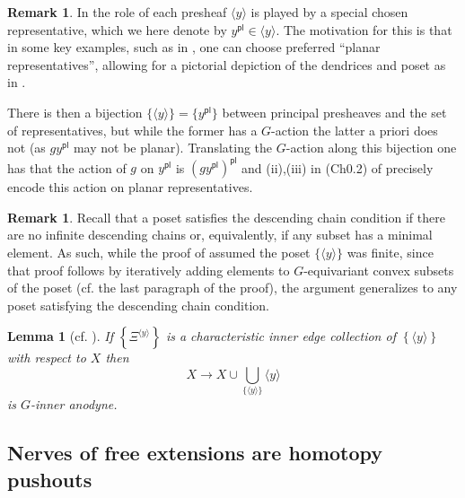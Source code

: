 \documentclass[a4paper,10pt
,draft
]{article}%
\numberwithin{equation}{section}
\numberwithin{figure}{section}
\newtheorem{lemma}[equation]{Lemma}%
\theoremstyle{definition} %
\newtheorem{remark}[equation]{Remark}%
\newcommand{\1}{\ensuremath{\mathbbm 1}}%
\begin{document}
\begin{remark}\label{CH02 REM}
	In \cite[Rem. 3.7]{BP_edss} the role of each presheaf 
	$\langle y \rangle$ is played by a special chosen representative,
	which we here denote by
	$y^{\mathsf{pl}} \in \langle y \rangle$. 
	The motivation for this is that in some key examples, such as in \cite[Ex. 3.9]{BP_edss}, one can choose preferred ``planar representatives'',
	allowing for a pictorial depiction of the dendrices and poset as in
	\cite[Fig. 3.1]{BP_edss}. 
	
	There is then a bijection $\{\langle y \rangle\} = \{ y^{\mathsf{pl}}\}$ between principal presheaves and the set of representatives, but while the former has a $G$-action the latter a priori does not (as $gy^{\mathsf{pl}}$ may not be planar). Translating the $G$-action along this bijection one has that the action of $g$ on $y^{\mathsf{pl}}$ is
	$(g y^{\mathsf{pl}})^{\mathsf{pl}}$ and (ii),(iii) in 
	(Ch0.2) of \cite[Rem. 3.7]{BP_edss} precisely 
	encode this action on planar representatives.
\end{remark}

\begin{remark}\label{DCC REM}
	Recall that a poset satisfies the descending chain condition if there are no infinite descending chains or, equivalently, if any subset has a minimal element. As such, while the proof of \cite[Lemma 3.4]{BP_edss}
	assumed the poset $\{\langle y \rangle\}$ was finite,
	since that proof follows by iteratively adding elements to $G$-equivariant convex subsets of the poset (cf. the last paragraph of the proof), the argument generalizes to any poset satisfying the descending chain condition.
\end{remark}

\begin{lemma}[{cf. \cite[Lemma 3.4]{BP_edss}}]
	\label{CHAREDGE LEM}
	If
	$
	\left\{ \Xi^{\langle y \rangle} \right \} 
	$
	is a \emph{characteristic inner edge collection} 
	of $\left\{ \langle y \rangle \right\}$ with respect to $X$ then
	\begin{equation}\label{CHAREDGE EQ}
	X \to X \cup \bigcup_{\{\langle y \rangle\}} \langle y \rangle
	\end{equation}
	is $G$-inner anodyne.
\end{lemma}



\subsection{Nerves of free extensions are homotopy pushouts}
\end{document}
